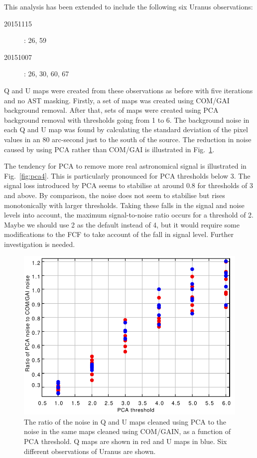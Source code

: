 \documentclass[twoside,11pt]{starlink}
\begin{document}
This analysis has been extended to include the following six Uranus
observations:
\begin{description}
\item[20151115]: 26, 59
\item[20151007]: 26, 30, 60, 67
\end{description}

Q and U maps were created from these observations as before with five
iterations and no AST masking. Firstly, a set of maps was created using
COM/GAI background removal. After that, sets of maps were created using
PCA background removal with thresholds going from 1 to 6. The background
noise in each Q and U map was found by calculating the standard deviation
of the pixel values in an 80 arc-second just to the south of the source.
The reduction in noise caused by using PCA rather than COM/GAI is
illustrated in Fig.~\ref{fig:pca3}.

The tendency for PCA to remove more real astronomical signal is
illustrated in Fig.~\ref{fig:pca4}. This is particularly pronounced for
PCA thresholds below 3. The signal loss introduced by PCA seems to stabilise
at around 0.8 for thresholds of 3 and above. By comparison, the noise
does not seem to stabilise but rises monotonically with larger thresholds.
Taking these falls in the signal and noise levels into account, the maximum
signal-to-noise ratio occurs for a threshold of 2. Maybe we should use 2
as the default instead of 4, but it would require some modifications to
the FCF to take account of the fall in signal level. Further
investigation is needed.

\begin{figure}
\includegraphics[width=\columnwidth]{pca3}
\caption{The ratio of the noise in Q and U maps cleaned using PCA to the
noise in the same maps cleaned using COM/GAIN, as a function of PCA threshold.
Q maps are shown in red and U maps in blue. Six different observations of
Uranus are shown.}
\label{fig:pca3}
\end{figure}
\end{document}
